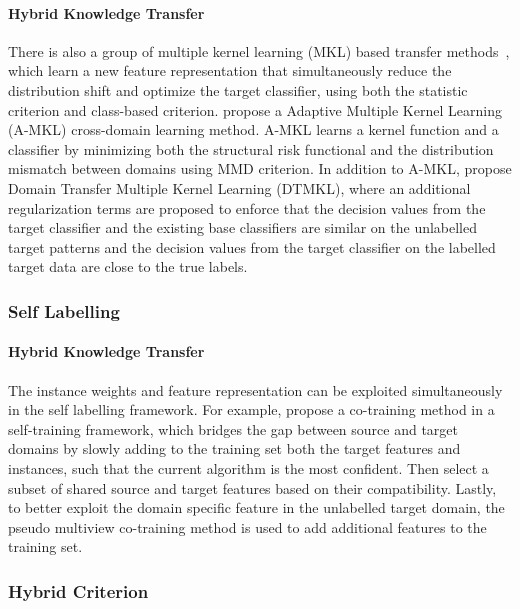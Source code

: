 \documentclass[prodmode]{acmsmall}  %
\begin{document}
\paragraph{Hybrid Knowledge Transfer}
There is also a group of multiple kernel learning (MKL) based transfer methods~\cite{Duan2012a,Duan2012}, which learn a new feature representation that simultaneously reduce the distribution shift and optimize the target classifier, using both the statistic criterion and class-based criterion.
 propose a Adaptive Multiple Kernel Learning (A-MKL) cross-domain learning method. A-MKL learns a kernel function and a classifier by minimizing both the structural risk functional and the distribution mismatch between domains using MMD criterion. In addition to A-MKL,  propose Domain Transfer Multiple Kernel Learning (DTMKL), where an additional regularization terms are proposed to enforce that the decision values from the target classifier and the existing base classifiers are similar on the unlabelled target patterns and the decision values from the target classifier on the labelled target data are close to the true labels. 

\subsubsection{Self Labelling}
\paragraph{Hybrid Knowledge Transfer}
The instance weights and feature representation can be exploited simultaneously in the self labelling framework. For example,  propose a co-training method in a self-training framework, which bridges the gap between source and target domains by slowly adding to the training set both the target features and instances, such that the current algorithm is the most confident. Then select a subset of shared source and target features based on their compatibility. Lastly, to better exploit the domain specific feature in the unlabelled target domain, the pseudo multiview co-training method is used to add additional features to the training set. 
\subsubsection{Hybrid Criterion}
\end{document}
